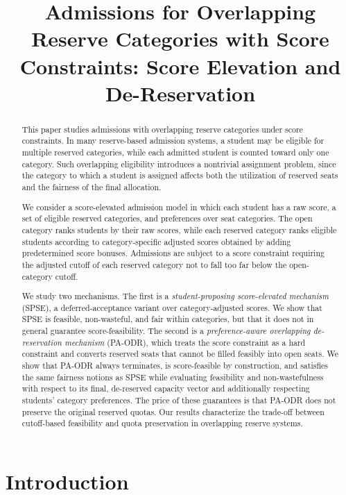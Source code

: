 \documentclass[10pt]{article}
\title{Admissions for Overlapping Reserve Categories with Score Constraints:
Score Elevation and De-Reservation}
\author{}
\date{}
\newcommand{\1}{\mathbf{1}}
\begin{document}
\maketitle
\vspace{-2em}

\begin{abstract}
This paper studies admissions with overlapping reserve categories under score constraints. In many reserve-based admission systems, a student may be eligible for multiple reserved categories, while each admitted student is counted toward only one category. Such overlapping eligibility introduces a nontrivial assignment problem, since the category to which a student is assigned affects both the utilization of reserved seats and the fairness of the final allocation.

We consider a score-elevated admission model in which each student has a raw score, a set of eligible reserved categories, and preferences over seat categories. The open category ranks students by their raw scores, while each reserved category ranks eligible students according to category-specific adjusted scores obtained by adding predetermined score bonuses. Admissions are subject to a score constraint requiring the adjusted cutoff of each reserved category not to fall too far below the open-category cutoff.

We study two mechanisms. The first is a \emph{student-proposing score-elevated mechanism} (SPSE), a deferred-acceptance variant over category-adjusted scores. We show that SPSE is feasible, non-wasteful, and fair within categories, but that it does not in general guarantee score-feasibility. The second is a \emph{preference-aware overlapping de-reservation mechanism} (PA-ODR), which treats the score constraint as a hard constraint and converts reserved seats that cannot be filled feasibly into open seats. We show that PA-ODR always terminates, is score-feasible by construction, and satisfies the same fairness notions as SPSE while evaluating feasibility and non-wastefulness with respect to its final, de-reserved capacity vector and additionally respecting students' category preferences. The price of these guarantees is that PA-ODR does not preserve the original reserved quotas. Our results characterize the trade-off between cutoff-based feasibility and quota preservation in overlapping reserve systems.
\end{abstract}

\section{Introduction}
\end{document}
